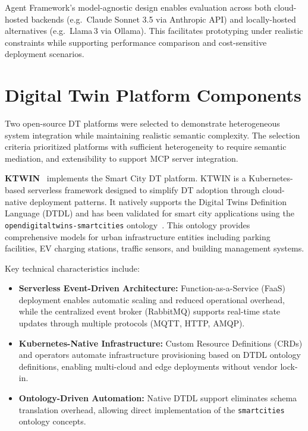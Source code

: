 Agent Framework's model-agnostic design enables evaluation across both
    cloud-hosted backends (e.g.\ Claude Sonnet 3.5 via Anthropic API) and
    locally-hosted alternatives (e.g.\ Llama\,3 via Ollama).
This facilitates prototyping under realistic constraints while
    supporting performance comparison and cost-sensitive deployment scenarios.

\section{Digital Twin Platform Components}
\label{sec:digital-twin-platform-components}

Two open-source DT platforms were selected to demonstrate heterogeneous system integration
    while maintaining realistic semantic complexity.
The selection criteria prioritized platforms with
    sufficient heterogeneity to require semantic mediation, and
    extensibility to support MCP server integration.

\textbf{KTWIN}~\cite{Wermann_Wickboldt_2025} implements the Smart City DT platform.
KTWIN is a Kubernetes-based serverless framework designed to 
    simplify DT adoption through cloud-native deployment patterns.
It natively supports the Digital Twins Definition Language (DTDL) and has been
    validated for smart city applications using the
    \texttt{opendigitaltwins-smartcities} ontology~\cite{russomAzureOpendigitaltwinssmartcities2021}.
This ontology provides comprehensive models for
    urban infrastructure entities including
    parking facilities,
    EV charging stations,
    traffic sensors, and
    building management systems.

Key technical characteristics include:

\begin{itemize}
    \item \textbf{Serverless Event-Driven Architecture:}
    Function-as-a-Service (FaaS) deployment enables
        automatic scaling and
        reduced operational overhead, while
        the centralized event broker (RabbitMQ) supports
        real-time state updates through
        multiple protocols (MQTT, HTTP, AMQP).

    \item \textbf{Kubernetes-Native Infrastructure:}
    Custom Resource Definitions (CRDs) and operators automate
        infrastructure provisioning based on
        DTDL ontology definitions,
        enabling multi-cloud and edge deployments without vendor lock-in.
    
    \item \textbf{Ontology-Driven Automation:}
    Native DTDL support eliminates schema translation overhead,
        allowing direct implementation of the \texttt{smartcities} ontology concepts.
\end{itemize}

